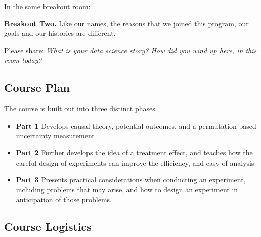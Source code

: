 \documentclass[
]{article}
\providecommand{\tightlist}{%
  \setlength{\itemsep}{0pt}\setlength{\parskip}{0pt}}
\begin{document}
In the same breakout room:

\begin{breakout}
\textbf{Breakout Two.}
Like our names, the reasons that we joined this program, our goals and our histories are different.

Please share: \emph{What is your data science story? How did you wind up here, in this room today?}

\end{breakout}

\hypertarget{course-plan}{%
\subsection{Course Plan}\label{course-plan}}

The course is built out into three distinct phases

\begin{itemize}
\tightlist
\item
  \textbf{Part 1} Develops causal theory, potential outcomes, and a permutation-based uncertainty measurement
\item
  \textbf{Part 2} Further develops the idea of a treatment effect, and teaches how the careful design of experiments can improve the efficiency, and easy of analysis
\item
  \textbf{Part 3} Presents practical considerations when conducting an experiment, including problems that may arise, and how to design an experiment in anticipation of those problems.
\end{itemize}

\hypertarget{course-logistics}{%
\subsection{Course Logistics}\label{course-logistics}}
\end{document}
